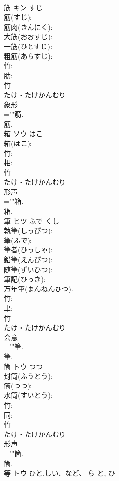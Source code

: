 \documentclass[8pt]{extreport}
\begin{document}
\begin{CJK}{UTF8}{min}
\\	筋	キン	すじ		
\\	筋(すじ): 
\\	筋肉(きんにく): 
\\	大筋(おおすじ): 
\\	一筋(ひとすじ): 
\\	粗筋(あらすじ): 
\\	竹: 
\\	肋: 
\\	竹	
\\	たけ・たけかんむり	
\\	象形 
\\	=""筋.
\\	筋.
\\	箱	ソウ	はこ		
\\	箱(はこ): 
\\	竹: 
\\	相: 
\\	竹	
\\	たけ・たけかんむり	
\\	形声 
\\	=""箱.
\\	箱.
\\	筆	ヒツ	ふで	くし	
\\	執筆(しっぴつ): 
\\	筆(ふで): 
\\	筆者(ひっしゃ): 
\\	鉛筆(えんぴつ): 
\\	随筆(ずいひつ): 
\\	筆記(ひっき): 
\\	万年筆(まんねんひつ): 
\\	竹: 
\\	聿: 
\\	竹	
\\	たけ・たけかんむり	
\\	会意 
\\	=""筆.
\\	筆.
\\	筒	トウ	つつ		
\\	封筒(ふうとう): 
\\	筒(つつ): 
\\	水筒(すいとう): 
\\	竹: 
\\	同: 
\\	竹	
\\	たけ・たけかんむり	
\\	形声 
\\	=""筒.
\\	筒.
\\	等	トウ	ひと.しい、など、-ら	と, ひ	

\end{CJK}
\end{document}

